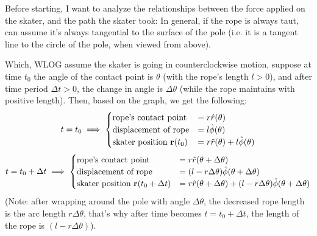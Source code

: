 \documentclass{article}
\newcommand{\br}{\textbf{r}} %
\begin{document}
Before starting, I want to analyze the relationships between the force applied on the skater, and the path the skater took: In general, if the rope is always taut, can assume it's always tangential to the surface of the pole (i.e. it is a tangent line to the circle of the pole, when viewed from above). 

Which, WLOG assume the skater is going in counterclockwise motion, suppose at time $t_0$ the angle of the contact point is $\theta$ (with the rope's length $l>0$), and after time period $\Delta t>0$, the change in angle is $\Delta \theta$ (while the rope maintains with positive length). Then, based on the graph, we get the following:
\begin{align}
    t=t_0 \implies \begin{cases}
        \textmd{rope's contact point} &= r\hat{r}(\theta)\\
        \textmd{displacement of rope} &= l\hat{\phi}(\theta)\\
        \textmd{skater position }\br(t_0) &= r\hat{r}(\theta)+l\hat{\phi}(\theta)
    \end{cases}
\end{align}
\begin{align}
    t=t_0+\Delta t \implies \begin{cases}
        \textmd{rope's contact point} &= r\hat{r}(\theta+\Delta\theta)\\
        \textmd{displacement of rope} &= (l-r\Delta \theta)\hat{\phi}(\theta+\Delta\theta)\\
        \textmd{skater position }\br(t_0+\Delta t) &= r\hat{r}(\theta+\Delta\theta) + (l-r\Delta\theta)\hat{\phi}(\theta+\Delta\theta)
    \end{cases}
\end{align}
(Note: after wrapping around the pole with angle $\Delta\theta$, the decreased rope length is the arc length $r\Delta\theta$, that's why after time becomes $t=t_0+\Delta t$, the length of the rope is $(l-r\Delta\theta)$).
\end{document}
